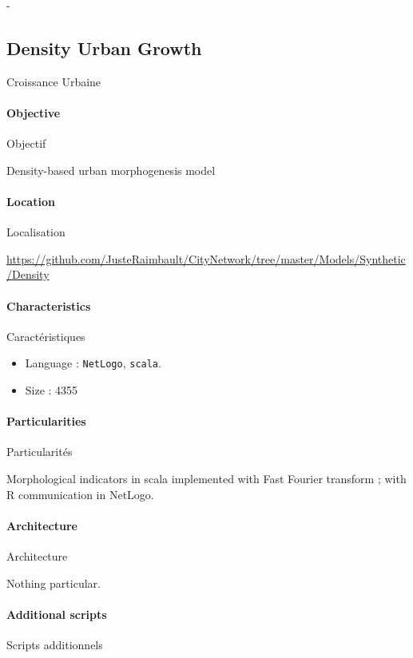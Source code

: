 -





\subsection{Density Urban Growth}{Croissance Urbaine}

\paragraph{Objective}{Objectif}

Density-based urban morphogenesis model

\paragraph{Location}{Localisation}

\url{https://github.com/JusteRaimbault/CityNetwork/tree/master/Models/Synthetic/Density}

\paragraph{Characteristics}{Caractéristiques}

\begin{itemize}
\item Language : \texttt{NetLogo}, \texttt{scala}.
\item Size : 4355
\end{itemize}


\paragraph{Particularities}{Particularités}

Morphological indicators in scala implemented with Fast Fourier transform ; with R communication in NetLogo.

\paragraph{Architecture}{Architecture}

Nothing particular.

\paragraph{Additional scripts}{Scripts additionnels}

